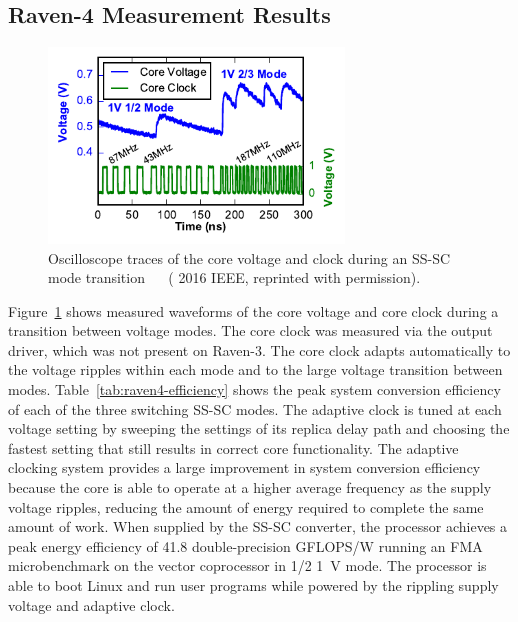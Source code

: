 \documentclass[graybox]{svmult}
\begin{document}
\subsection{Raven-4 Measurement Results}


\begin{figure}
  \centering
  \includegraphics[width=0.7\textwidth]{6-raven4-waveforms}
  \caption{Oscilloscope traces of the core voltage and clock during an SS-SC mode transition~\cite{Keller2017} ~\cite{Keller2016} ({\textcopyright} 2016 IEEE, reprinted with permission).}
  \label{fig:6-raven4-waveforms}
\end{figure}

Figure~\ref{fig:6-raven4-waveforms} shows measured waveforms of the core voltage and core clock during a transition between voltage modes.
The core clock was measured via the output driver, which was not present on Raven-3.
The core clock adapts automatically to the voltage ripples within each mode and to the large voltage transition between modes.
Table~\ref{tab:raven4-efficiency} shows the peak system conversion efficiency of each of the three switching SS-SC modes.
The adaptive clock is tuned at each voltage setting by sweeping the settings of its replica delay path and choosing the fastest setting that still results in correct core functionality.
The adaptive clocking system provides a large improvement in system conversion efficiency because the core is able to operate at a higher average frequency as the supply voltage ripples, reducing the amount of energy required to complete the same amount of work.
When supplied by the SS-SC converter, the processor achieves a peak energy efficiency of 41.8 double-precision GFLOPS/W running an FMA microbenchmark on the vector coprocessor in 1/2 \SI{1}{\volt} mode.
The processor is able to boot Linux and run user programs while powered by the rippling supply voltage and adaptive clock.
\end{document}
